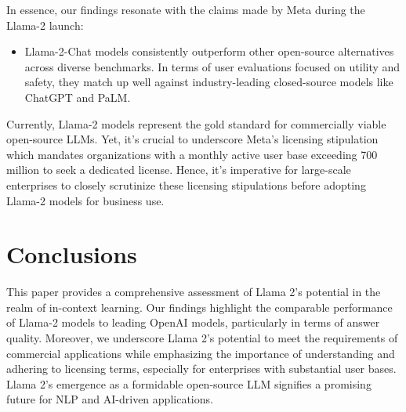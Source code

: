 \documentclass[conference]{IEEEtran}
\begin{document}
In essence, our findings resonate with the claims made by Meta during the Llama-2 launch:
\begin{itemize}
    \item Llama-2-Chat models consistently outperform other open-source alternatives across diverse benchmarks. In terms of user evaluations focused on utility and safety, they match up well against industry-leading closed-source models like ChatGPT and PaLM. 
\end{itemize}

Currently, Llama-2 models represent the gold standard for commercially viable open-source LLMs. Yet, it's crucial to underscore Meta's licensing stipulation which mandates organizations with a monthly active user base exceeding 700 million to seek a dedicated license. Hence, it's imperative for large-scale enterprises to closely scrutinize these licensing stipulations before adopting Llama-2 models for business use.

\section{Conclusions}
This paper provides a comprehensive assessment of Llama 2's potential in the realm of in-context learning. Our findings highlight the comparable performance of Llama-2 models to leading OpenAI models, particularly in terms of answer quality. Moreover, we underscore Llama 2's potential to meet the requirements of commercial applications while emphasizing the importance of understanding and adhering to licensing terms, especially for enterprises with substantial user bases. Llama 2's emergence as a formidable open-source LLM signifies a promising future for NLP and AI-driven applications.



\end{document}
